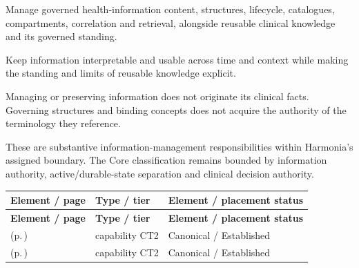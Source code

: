 
Manage governed health-information content, structures, lifecycle, catalogues, compartments, correlation and retrieval, alongside reusable clinical knowledge and its governed standing.



Keep information interpretable and usable across time and context while making the standing and limits of reusable knowledge explicit.



Managing or preserving information does not originate its clinical facts. Governing structures and binding concepts does not acquire the authority of the terminology they reference.



These are substantive information-management responsibilities within Harmonia's assigned boundary. The Core classification remains bounded by information authority, active/\allowbreak{}durable-state separation and clinical decision authority.


\begingroup\small\setlength{\TableWidth}{\dimexpr\linewidth-6\tabcolsep-4\arrayrulewidth\relax}
\begin{longtable}{|>{\raggedright\arraybackslash}p{0.52\TableWidth}|>{\raggedright\arraybackslash}p{0.2\TableWidth}|>{\raggedright\arraybackslash}p{0.28\TableWidth}|}
\hline\rowcolor{TableHead}\textbf{Element / page} & \textbf{Type / tier} & \textbf{Element / placement status}\\\hline\endfirsthead
\hline\rowcolor{TableHead}\textbf{Element / page} & \textbf{Type / tier} & \textbf{Element / placement status}\\\hline\endhead
\hline\endfoot
\nameref{cap:bc-health-information-management} (p.\,\pageref{cap:bc-health-information-management}) & capability CT2 & Canonical / Established\\\hline
\nameref{cap:bc-clinical-knowledge-management} (p.\,\pageref{cap:bc-clinical-knowledge-management}) & capability CT2 & Canonical / Established\\\hline
\end{longtable}\endgroup

